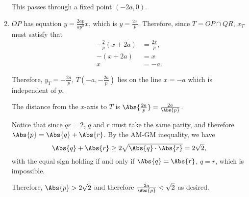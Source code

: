 \begin{enumerate}
          This passes through a fixed point \((-2a, 0)\).

    \item \(OP\) has equation \(y = \frac{2ap}{ap^2}x\), which is \(y = \frac{2x}{p}\).
          Therefore, since \(T = OP \cap QR\), \(x_T\) must satisfy that
          \begin{align*}
              -\frac{2}{p} (x + 2a) & = \frac{2x}{p}, \\
              -(x + 2a)             & = x             \\
              x                     & = -a.
          \end{align*}

          Therefore, \(y_T = -\frac{2a}{p}\), \(T\left(-a, -\frac{2a}{p}\right)\) lies on the line \(x = -a\) which is independent of \(p\).

          The distance from the \(x\)-axis to \(T\) is \(\Abs{\frac{2a}{p}} = \frac{2a}{\Abs{p}}\).

          Notice that since \(qr = 2\), \(q\) and \(r\) must take the same parity, and therefore \(\Abs{p} = \Abs{q} + \Abs{r}\). By the AM-GM inequality, we have
          \[
              \Abs{q} + \Abs{r} \geq 2 \sqrt{\Abs{q} \cdot \Abs{r}} = 2\sqrt{2},
          \]
          with the equal sign holding if and only if \(\Abs{q} = \Abs{r}\), \(q = r\), which is impossible.

          Therefore, \(\Abs{p} > 2\sqrt{2}\) and therefore \(\frac{2a}{\Abs{p}} < \sqrt{2}\) as desired.
\end{enumerate}